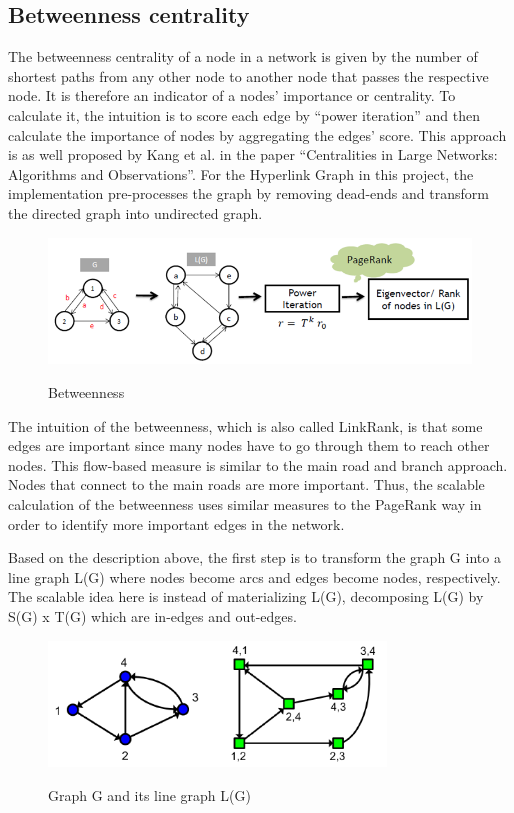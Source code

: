 \subsection{Betweenness centrality}
The betweenness centrality of a node in a network is given by the number of shortest paths from any other node to another node that passes the respective node. It is therefore an indicator of a nodes’ importance or centrality. To calculate it, the intuition is to score each edge by “power iteration” and then calculate the importance of nodes by aggregating the edges’ score. This approach is as well proposed by Kang et al. in the paper “Centralities in Large Networks: Algorithms and Observations”. For the Hyperlink Graph in this project, the implementation pre-processes the graph by removing dead-ends and transform the directed graph into undirected graph.

\begin{figure}[H]
	\begin{center}
		\label{fig5}		
		\includegraphics[width=1.0\textwidth]{fig5}	
		\caption{Betweenness}	
	\end{center}
\end{figure}

The intuition of the betweenness, which is also called LinkRank, is that some edges are important since many nodes have to go through them to reach other nodes. This flow-based measure is similar to the main road and branch approach. Nodes that connect to the main roads are more important. Thus, the scalable calculation of the betweenness uses similar measures to the PageRank way in order to identify more important edges in the network.

Based on the description above, the first step is to transform the graph G into a line graph L(G) where nodes become arcs and edges become nodes, respectively. The scalable idea here is instead of materializing L(G), decomposing L(G) by S(G) x T(G) which are in-edges and out-edges. 

\begin{figure}[H]
	\begin{center}
		\label{fig6}		
		\includegraphics[width=0.8\textwidth]{fig6}	
		\caption{Graph G and its line graph L(G)}	
	\end{center}
\end{figure}

